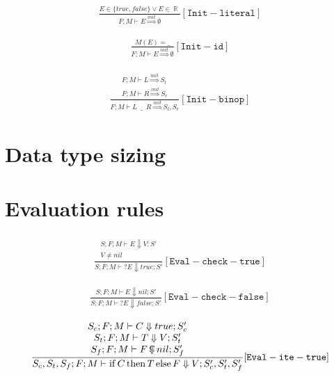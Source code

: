 \documentclass{scrartcl}
\DeclareMathOperator{\ifop}{if}
\DeclareMathOperator{\thenop}{then}
\DeclareMathOperator{\elseop}{else}
\DeclareMathOperator{\numtype}{\mathbb{R}}
\DeclareMathOperator{\ceval}{\overset{C}{\smash{\Downarrow}}}
\begin{document}
    \begin{align*}
    \frac{
        E \in \{ true, false \} \lor E \in \numtype
    }{
        F; M \vdash E \overset{init}{\Rightarrow} \emptyset
    }[\mathtt{Init-literal}]
    \end{align*}
    
    \begin{align*}
    \frac{
        M(E) = \_
    }{
        F; M \vdash E \overset{init}{\Rightarrow} \emptyset
    }[\mathtt{Init-id}]
    \end{align*}
    
    \begin{align*}
    \frac{
        \begin{matrix}
        F; M \vdash L \overset{init}{\Rightarrow} S_l \\
        F; M \vdash R \overset{init}{\Rightarrow} S_r
        \end{matrix}
    }{
        F; M \vdash L \enspace \_ \enspace R \overset{init}{\Rightarrow} S_l, S_r
    }[\mathtt{Init-binop}]
    \end{align*}
    
    \section{Data type sizing}
    
    

    \section{Evaluation rules}
    
    \begin{align*}
    \frac{
        \begin{matrix}
        S; F; M \vdash E \Downarrow V; S' \\
        V \neq nil
        \end{matrix}
    }{
        S; F; M \vdash ?E \Downarrow true; S'
    }[\mathtt{Eval-check-true}]
    \end{align*}
    
    \begin{align*}
    \frac{
        S; F; M \vdash E \Downarrow nil; S'
    }{
        S; F; M \vdash ?E \Downarrow false; S'
    }[\mathtt{Eval-check-false}]
    \end{align*}
    
    \begin{align*}
    \frac{
        \begin{matrix}
        S_c; F; M \vdash C \Downarrow true; S_c' \\
        S_t; F; M \vdash T \Downarrow V; S_t' \\
        S_f; F; M \vdash F \ceval nil; S_f'
        \end{matrix}
    }{
        S_c, S_t, S_f; F; M \vdash \ifop C \thenop T \elseop F \Downarrow V; S_c', S_t', S_f'
    }[\mathtt{Eval-ite-true}]
    \end{align*}
    
\end{document}
